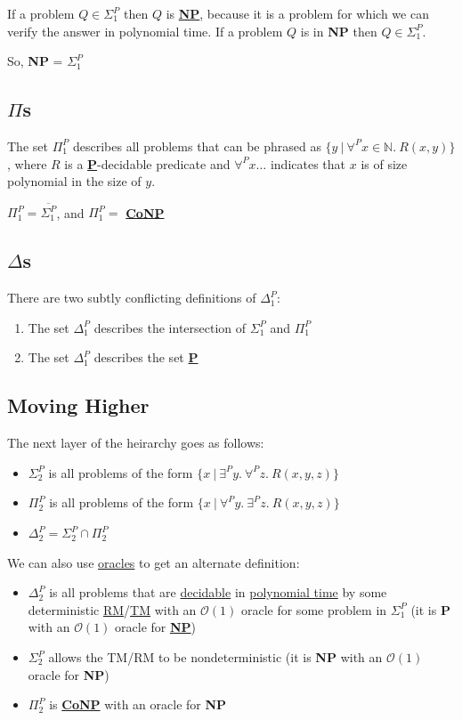 \documentclass{article}
\begin{document}
If a problem $Q \in \Sigma_1^P$ then $Q$ is \hyperref[NP]{\textbf{NP}}, because it is a problem for which we can verify the answer in polynomial time. If a problem $Q$ is in \textbf{NP} then $Q \in \Sigma_1^P$.

So, \textbf{NP} = $\Sigma_1^P$

\subsection{$\Pi$s}
The set $\Pi_1^P$ describes all problems that can be phrased as $\{y \:|\: \forall^P x \in \mathbb{N}. \: R(x,y)\}$, where $R$ is a \hyperref[P]{\textbf{P}}-decidable predicate and $\forall^P x \dots$ indicates that $x$ is of size polynomial in the size of $y$.

$\Pi_1^P = \overline{\Sigma_1^P}$, and $\Pi_1^P=$ \hyperref[CoNP]{\textbf{CoNP}}

\subsection{$\Delta$s}
There are two subtly conflicting definitions of $\Delta_1^P$:
\begin{enumerate}
    \item The set $\Delta_1^P$ describes the intersection of $\Sigma_1^P$ and $\Pi_1^P$
    \item The set $\Delta_1^P$ describes the set \hyperref[P]{\textbf{P}}
\end{enumerate}

\subsection{Moving Higher}
The next layer of the heirarchy goes as follows:
\begin{itemize}
    \item $\Sigma_2^P$ is all problems of the form $\{x \:|\: \exists^P y.\: \forall^P z.\: R(x,y,z)\}$
    \item $\Pi_2^P$ is all problems of the form $\{x \:|\: \forall^P y.\: \exists^P z.\: R(x,y,z)\}$
    \item $\Delta_2^P = \Sigma_2^P \cap \Pi_2^P$
\end{itemize}

We can also use \hyperref[oracle]{oracles} to get an alternate definition:
\begin{itemize}
    \item $\Delta_2^P$ is all problems that are \hyperref[decidable]{decidable} in \hyperref[P]{polynomial time} by some deterministic \hyperref[rm]{RM}/\hyperref[tm]{TM} with an $\mathcal{O}(1)$ oracle for some problem in $\Sigma_1^P$ (it is \textbf{P} with an $\mathcal{O}(1)$ oracle for \hyperref[NP]{\textbf{NP}})
    \item $\Sigma_2^P$ allows the TM/RM to be nondeterministic (it is \textbf{NP} with an $\mathcal{O}(1)$ oracle for \textbf{NP})
    \item $\Pi_2^P$ is \hyperref[CoNP]{\textbf{CoNP}} with an oracle for \textbf{NP}
\end{itemize}
\end{document}

